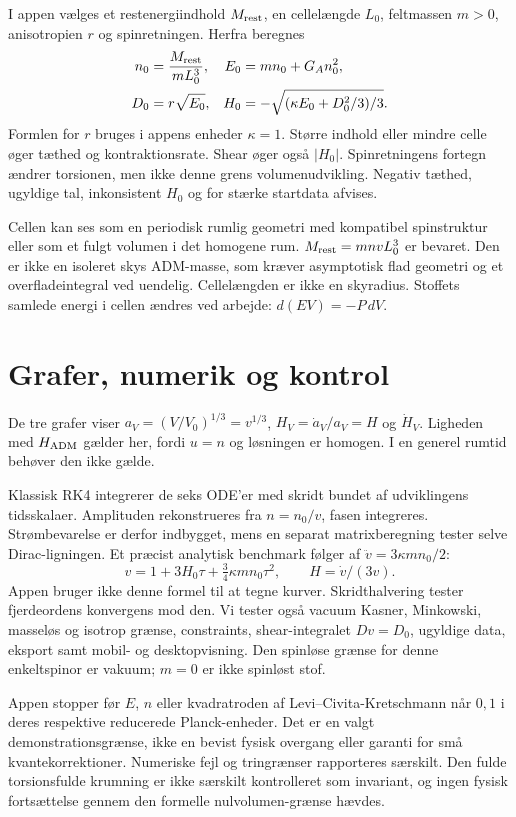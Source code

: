 \documentclass[11pt,a4paper]{article}
\begin{document}
I appen vælges et restenergiindhold $M_{\rm rest}$, en cellelængde $L_0$, feltmassen $m>0$, anisotropien $r$ og spinretningen. Herfra beregnes
\begin{align}
 n_0&=\frac{M_{\rm rest}}{m L_0^3},& E_0&=mn_0+G_A n_0^2,\\
 D_0&=r\sqrt{E_0},& H_0&=-\sqrt{(\kappa E_0+D_0^2/3)/3}.
\end{align}
Formlen for $r$ bruges i appens enheder $\kappa=1$. Større indhold eller mindre celle øger tæthed og kontraktionsrate. Shear øger også $|H_0|$. Spinretningens fortegn ændrer torsionen, men ikke denne grens volumenudvikling. Negativ tæthed, ugyldige tal, inkonsistent $H_0$ og for stærke startdata afvises.

Cellen kan ses som en periodisk rumlig geometri med kompatibel spinstruktur eller som et fulgt volumen i det homogene rum. $M_{\rm rest}=m n v L_0^3$ er bevaret. Den er ikke en isoleret skys ADM-masse, som kræver asymptotisk flad geometri og et overfladeintegral ved uendelig. Cellelængden er ikke en skyradius. Stoffets samlede energi i cellen ændres ved arbejde: $d(EV)=-P\,dV$.

\section{Grafer, numerik og kontrol}
De tre grafer viser $a_V=(V/V_0)^{1/3}=v^{1/3}$, $H_V=\dot a_V/a_V=H$ og $\dot H_V$. Ligheden med $H_{\rm ADM}$ gælder her, fordi $u=n$ og løsningen er homogen. I en generel rumtid behøver den ikke gælde.

Klassisk RK4 integrerer de seks ODE'er med skridt bundet af udviklingens tidsskalaer. Amplituden rekonstrueres fra $n=n_0/v$, fasen integreres. Strømbevarelse er derfor indbygget, mens en separat matrixberegning tester selve Dirac-ligningen. Et præcist analytisk benchmark følger af $\ddot v=3\kappa mn_0/2$:
\begin{equation}
 v=1+3H_0\tau+\tfrac34\kappa mn_0\tau^2,\qquad H=\dot v/(3v).
\end{equation}
Appen bruger ikke denne formel til at tegne kurver. Skridthalvering tester fjerdeordens konvergens mod den. Vi tester også vacuum Kasner, Minkowski, masseløs og isotrop grænse, constraints, shear-integralet $Dv=D_0$, ugyldige data, eksport samt mobil- og desktopvisning. Den spinløse grænse for denne enkeltspinor er vakuum; $m=0$ er ikke spinløst stof.

Appen stopper før $E$, $n$ eller kvadratroden af Levi--Civita-Kretschmann når $0{,}1$ i deres respektive reducerede Planck-enheder. Det er en valgt demonstrationsgrænse, ikke en bevist fysisk overgang eller garanti for små kvantekorrektioner. Numeriske fejl og tringrænser rapporteres særskilt. Den fulde torsionsfulde krumning er ikke særskilt kontrolleret som invariant, og ingen fysisk fortsættelse gennem den formelle nulvolumen-grænse hævdes.
\end{document}
